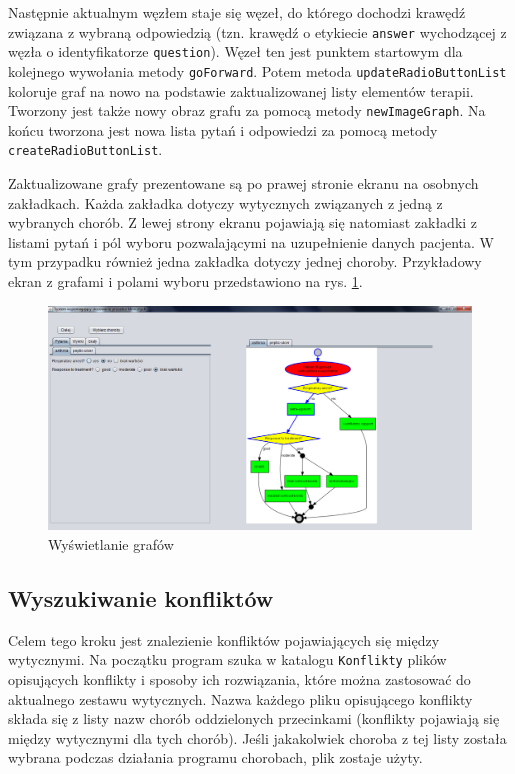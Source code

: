 Następnie aktualnym węzłem staje się węzeł, do którego dochodzi krawędź związana z wybraną odpowiedzią (tzn. krawędź o etykiecie \texttt{answer} wychodzącej z węzła o identyfikatorze \texttt{question}). Węzeł ten jest punktem startowym dla kolejnego wywołania metody \texttt{goForward}. Potem metoda \texttt{updateRadioButtonList} koloruje graf na nowo na podstawie zaktualizowanej listy elementów terapii. Tworzony jest także nowy obraz grafu za pomocą metody \texttt{newImageGraph}. Na końcu tworzona jest nowa lista pytań i odpowiedzi za pomocą metody \texttt{createRadioButtonList}. 

Zaktualizowane grafy prezentowane są po prawej stronie ekranu na osobnych zakładkach. Każda zakładka dotyczy wytycznych związanych z jedną z wybranych chorób. Z lewej strony ekranu pojawiają się natomiast zakładki z listami pytań i pól wyboru pozwalającymi na uzupełnienie danych pacjenta. W tym przypadku również jedna zakładka dotyczy jednej choroby. Przykładowy ekran z grafami i polami wyboru przedstawiono na rys. \ref{fig:wyswietlanie_grafow}.
\begin{figure}[H]
\centering
\includegraphics[width=\textwidth]{img/wyswietlanie_grafow.png}
\caption{Wyświetlanie grafów}
\label{fig:wyswietlanie_grafow}
\end{figure}

\subsection{Wyszukiwanie konfliktów}
Celem tego kroku jest znalezienie konfliktów pojawiających się między wytycznymi. Na początku program szuka w katalogu \texttt{Konflikty} plików opisujących konflikty i sposoby ich rozwiązania, które można zastosować do aktualnego zestawu wytycznych. Nazwa każdego pliku opisującego konflikty składa się z listy nazw chorób oddzielonych przecinkami (konflikty pojawiają się między wytycznymi dla tych chorób). Jeśli jakakolwiek choroba z tej listy została wybrana podczas działania programu chorobach, plik zostaje użyty. 

